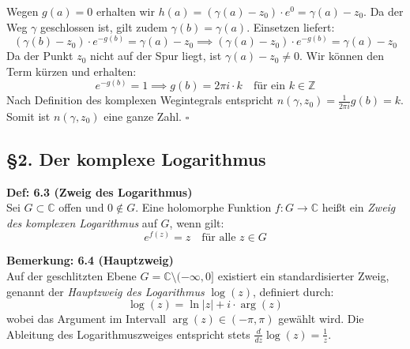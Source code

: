 Wegen $g(a) = 0$ erhalten wir $h(a) = (\gamma(a) - z_0) \cdot e^0 = \gamma(a) - z_0$. Da der Weg $\gamma$ geschlossen ist, gilt zudem $\gamma(b) = \gamma(a)$. Einsetzen liefert:
\[
(\gamma(b) - z_0) \cdot e^{-g(b)} = \gamma(a) - z_0 \implies (\gamma(a) - z_0) \cdot e^{-g(b)} = \gamma(a) - z_0
\]
Da der Punkt $z_0$ nicht auf der Spur liegt, ist $\gamma(a) - z_0 \neq 0$. Wir können den Term kürzen und erhalten:
\[
e^{-g(b)} = 1 \implies g(b) = 2\pi i \cdot k \quad \text{für ein } k \in \mathbb{Z}
\]
Nach Definition des komplexen Wegintegrals entspricht $n(\gamma, z_0) = \frac{1}{2\pi i} g(b) = k$. Somit ist $n(\gamma, z_0)$ eine ganze Zahl. \hfill $\square$


\vspace{1em}
\subsection*{\S 2. Der komplexe Logarithmus}

\noindent\textbf{Def: 6.3 (Zweig des Logarithmus)} \\
Sei $G \subset \mathbb{C}$ offen und $0 \notin G$. Eine holomorphe Funktion $f: G \rightarrow \mathbb{C}$ heißt ein \textit{Zweig des komplexen Logarithmus} auf $G$, wenn gilt:
\[
e^{f(z)} = z \quad \text{für alle } z \in G
\]

\vspace{1em}
\noindent\textbf{Bemerkung: 6.4 (Hauptzweig)} \\
Auf der geschlitzten Ebene $G = \mathbb{C} \setminus (-\infty, 0]$ existiert ein standardisierter Zweig, genannt der \textit{Hauptzweig des Logarithmus} $\log(z)$, definiert durch:
\[
\log(z) = \ln|z| + i \cdot \arg(z)
\]
wobei das Argument im Intervall $\arg(z) \in (-\pi, \pi)$ gewählt wird. Die Ableitung des Logarithmuszweiges entspricht stets $\frac{d}{dz}\log(z) = \frac{1}{z}$.
